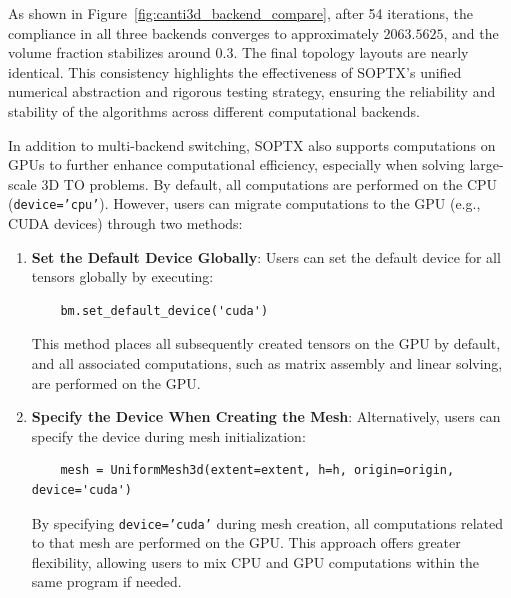 \documentclass[mathpazo]{cicp}
\begin{document}
As shown in Figure~\ref{fig:canti3d_backend_compare}, after 54 iterations, the compliance in all three backends converges to approximately $2063.5625$, and the volume fraction stabilizes around $0.3$. The final topology layouts are nearly identical. This consistency highlights the effectiveness of SOPTX's unified numerical abstraction and rigorous testing strategy, ensuring the reliability and stability of the algorithms across different computational backends.

In addition to multi-backend switching, SOPTX also supports computations on GPUs to further enhance computational efficiency, especially when solving large-scale 3D TO problems. By default, all computations are performed on the CPU (\texttt{device='cpu'}). However, users can migrate computations to the GPU (e.g., CUDA devices) through two methods:
\begin{enumerate}
	\item \textbf{Set the Default Device Globally}: Users can set the default device for all tensors globally by executing:
	\begin{lstlisting}
	bm.set_default_device('cuda')
	\end{lstlisting}
	This method places all subsequently created tensors on the GPU by default, and all associated computations, such as matrix assembly and linear solving, are performed on the GPU.
	\item \textbf{Specify the Device When Creating the Mesh}: Alternatively, users can specify the device during mesh initialization:
	\begin{lstlisting}
	mesh = UniformMesh3d(extent=extent, h=h, origin=origin, device='cuda')
	\end{lstlisting}
	By specifying \texttt{device='cuda'} during mesh creation, all computations related to that mesh are performed on the GPU. This approach offers greater flexibility, allowing users to mix CPU and GPU computations within the same program if needed.
\end{enumerate}
\end{document}
